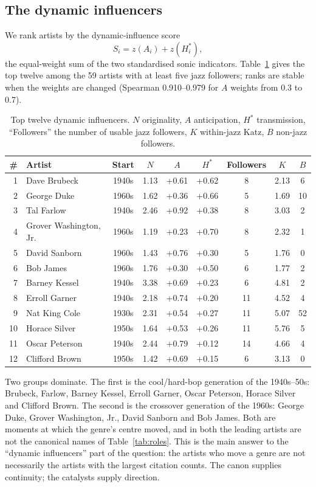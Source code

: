 \documentclass[11pt]{article}
\begin{document}
\subsection{The dynamic influencers}
We rank artists by the dynamic-influence score
\[
S_i=z(A_i)+z(H_i^*),
\]
the equal-weight sum of the two standardised sonic indicators.
Table~\ref{tab:top} gives the top twelve among the 59 artists with at least five jazz
followers; ranks are stable when the weights are changed (Spearman 0.910--0.979 for $A$ weights
from 0.3 to 0.7).

\begin{table}[!ht]
\centering
\small
\begin{tabular}{rlccccccc}
\toprule
\# & Artist & Start & $N$ & $A$ & $H^*$ & Followers & $K$ & $B$ \\
\midrule
1 & Dave Brubeck & 1940s & 1.13 & +0.61 & +0.62 & 8 & 2.13 & 6 \\
2 & George Duke & 1960s & 1.62 & +0.36 & +0.66 & 5 & 1.69 & 10 \\
3 & Tal Farlow & 1940s & 2.46 & +0.92 & +0.38 & 8 & 3.03 & 2 \\
4 & Grover Washington, Jr. & 1960s & 1.19 & +0.23 & +0.70 & 8 & 2.32 & 1 \\
5 & David Sanborn & 1960s & 1.43 & +0.76 & +0.30 & 5 & 1.76 & 0 \\
6 & Bob James & 1960s & 1.76 & +0.30 & +0.50 & 6 & 1.77 & 2 \\
7 & Barney Kessel & 1940s & 3.38 & +0.69 & +0.23 & 6 & 4.81 & 2 \\
8 & Erroll Garner & 1940s & 2.18 & +0.74 & +0.20 & 11 & 4.52 & 4 \\
9 & Nat King Cole & 1930s & 2.31 & +0.54 & +0.27 & 11 & 5.07 & 52 \\
10 & Horace Silver & 1950s & 1.64 & +0.53 & +0.26 & 11 & 5.76 & 5 \\
11 & Oscar Peterson & 1940s & 2.44 & +0.79 & +0.12 & 14 & 4.66 & 4 \\
12 & Clifford Brown & 1950s & 1.42 & +0.69 & +0.15 & 6 & 3.13 & 0 \\
\bottomrule
\end{tabular}
\caption{Top twelve dynamic influencers. $N$ originality, $A$ anticipation, $H^*$ transmission,
``Followers'' the number of usable jazz followers, $K$ within-jazz Katz, $B$ non-jazz followers.}
\label{tab:top}
\end{table}

Two groups dominate.
The first is the cool/hard-bop generation of the 1940s--50s: Brubeck, Farlow, Barney Kessel,
Erroll Garner, Oscar Peterson, Horace Silver and Clifford Brown.
The second is the crossover generation of the 1960s: George Duke, Grover Washington, Jr., David
Sanborn and Bob James.
Both are moments at which the genre's centre moved, and in both the leading artists are not the
canonical names of Table~\ref{tab:roles}.
This is the main answer to the ``dynamic influencers'' part of the question: the artists who move
a genre are not necessarily the artists with the largest citation counts.
The canon supplies continuity; the catalysts supply direction.
\end{document}
